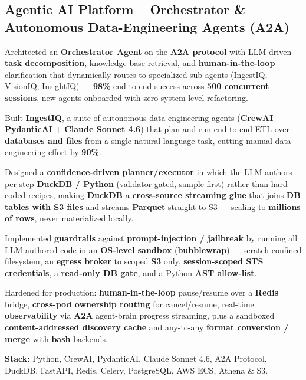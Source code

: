 \documentclass[letter,10pt]{article}
\begin{document}
\subsection{Agentic AI Platform -- Orchestrator \& Autonomous Data-Engineering Agents (A2A)}
\begin{zitemize}
\item Architected an \textbf{Orchestrator Agent} on the \textbf{A2A protocol} with LLM-driven \textbf{task decomposition}, knowledge-base retrieval, and \textbf{human-in-the-loop} clarification that dynamically routes to specialized sub-agents (IngestIQ, VisionIQ, InsightIQ) --- \textbf{98\%} end-to-end success across \textbf{500 concurrent sessions}, new agents onboarded with zero system-level refactoring.
\item Built \textbf{IngestIQ}, a suite of autonomous data-engineering agents (\textbf{CrewAI} + \textbf{PydanticAI} + \textbf{Claude Sonnet 4.6}) that plan and run end-to-end ETL over \textbf{databases and files} from a single natural-language task, cutting manual data-engineering effort by \textbf{90\%}.
\item Designed a \textbf{confidence-driven planner/executor} in which the LLM authors per-step \textbf{DuckDB / Python} (validator-gated, sample-first) rather than hard-coded recipes, making \textbf{DuckDB} a \textbf{cross-source streaming glue} that joins \textbf{DB tables with S3 files} and streams \textbf{Parquet} straight to S3 --- scaling to \textbf{millions of rows}, never materialized locally.
\item Implemented \textbf{guardrails} against \textbf{prompt-injection / jailbreak} by running all LLM-authored code in an \textbf{OS-level sandbox} (\textbf{bubblewrap}) --- scratch-confined filesystem, an \textbf{egress broker} to scoped \textbf{S3} only, \textbf{session-scoped STS credentials}, a \textbf{read-only DB gate}, and a Python \textbf{AST allow-list}.
\item Hardened for production: \textbf{human-in-the-loop} pause/resume over a \textbf{Redis} bridge, \textbf{cross-pod ownership routing} for cancel/resume, real-time \textbf{observability} via \textbf{A2A} agent-brain progress streaming, plus a sandboxed \textbf{content-addressed discovery cache} and any-to-any \textbf{format conversion / merge} with \textbf{bash} backends.
\item \textbf{Stack:} Python, CrewAI, PydanticAI, Claude Sonnet 4.6, A2A Protocol, DuckDB, FastAPI, Redis, Celery, PostgreSQL, AWS ECS, Athena \& S3.
\end{zitemize}
\end{document}
